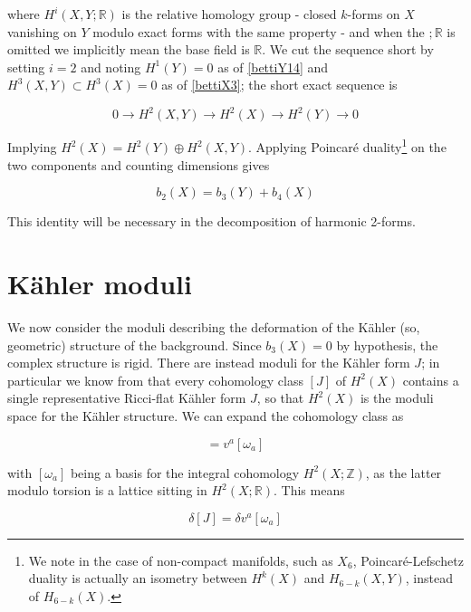 where $H^i(X,Y;\mathbb{R})$ is the relative homology group - closed $k$-forms on $X$ vanishing on $Y$ modulo exact forms with the same property - and when the $;\mathbb{R}$ is omitted we implicitly mean the base field is $\mathbb{R}$. We cut the sequence short by setting $i=2$ and noting $H^1(Y) = 0$ as of \ref{bettiY14} and $H^3(X,Y) \subset H^3(X) = 0$ as of \ref{bettiX3}; the short exact sequence is

\begin{equation}
	0 \rightarrow H^2(X,Y) \rightarrow H^2(X) \rightarrow H^2(Y) \rightarrow 0
\end{equation}

Implying $H^2(X) = H^2(Y) \oplus H^2(X,Y)$. Applying Poincaré duality\footnote{We note in the case of non-compact manifolds, such as $X_6$, Poincar\'e-Lefschetz duality is actually an isometry between $H^k(X)$ and $H_{6-k}(X,Y)$, instead of $H_{6-k}(X)$.} on the two components and counting dimensions gives

\begin{equation}
	b_2(X) = b_3(Y) + b_4(X) \label{bettidentity}
\end{equation}

This identity will be necessary in the decomposition of harmonic 2-forms.

\section{K\"ahler moduli} \label{sec:heftkm}

We now consider the moduli describing the deformation of the K\"ahler (so, geometric) structure of the background. Since $b_3(X) = 0$ by hypothesis, the complex structure is rigid. There are instead moduli for the K\"ahler form $J$; in particular we know from  that every cohomology class $[J]$ of $H^2(X)$ contains a single representative Ricci-flat K\"ahler form $J$, so that $H^2(X)$ is the moduli space for the K\"ahler structure. We can expand the cohomology class as

\begin{equation}
	[J] = v^a [\omega_a] \label{integraldecomposition}
\end{equation}

with $[\omega_a]$ being a basis for the integral cohomology $H^2(X;\mathbb Z)$, as the latter modulo torsion is a lattice sitting in $H^2(X;\mathbb R)$. This means

\begin{equation}
	\delta [J] = \delta v^a [\omega_a]
\end{equation}

